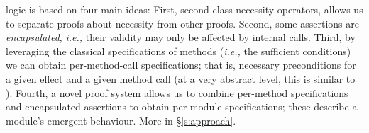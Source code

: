 \Nec logic is based on four main ideas: 
First, second class necessity operators, allows us to 
 separate proofs about necessity from other proofs.
 Second, some assertions are \emph{encapsulated}, \textit{i.e.,}
their validity may only be affected by internal calls. 
Third, by leveraging the classical  specifications of methods 
(\textit{i.e.,} the sufficient conditions) we can obtain per-method-call
 \Nec specifications; that is, necessary preconditions
  for a given effect and a given method call (at a very abstract level, this is
similar to ).
Fourth,  a novel proof system allows us to combine 
per-method \Nec specifications and encapsulated assertions 
 to obtain per-module   \Nec specifications; these describe a module's
 emergent behaviour.
More in \S\ref{s:approach}.
 
% 
% 
%
% 
% 



